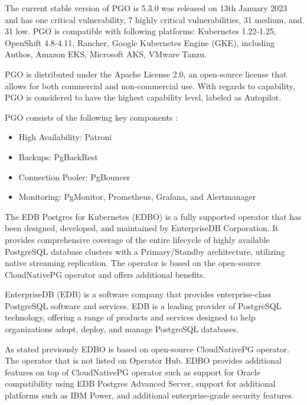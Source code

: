 The current stable version of PGO is 5.3.0 was released on 13th January 2023 and has one critical vulnerability, 7 highly critical vulnerabilities, 31 medium, and 31 low. \cite{ArtifactHubCrunchy}
PGO is compatible with following platforms: Kubernetes 1.22-1.25, OpenShift 4.8-4.11, Rancher, Google Kubernetes Engine (GKE), including Anthos, Amazon EKS, Microsoft AKS, VMware Tanzu. \cite{CrunchyDoc}

PGO is distributed under the Apache License 2.0, an open-source license that allows for both commercial and non-commercial use. With regards to capability, PGO is considered to have the highest capability level, labeled as Autopilot. \cite{OperatorHubCrunchy}

PGO consists of the following key components \cite{CrunchyPGOGit}:
\begin{itemize}
  \item High Availability: Patroni
  \item Backups: PgBackRest
  \item Connection Pooler: PgBouncer
  \item Monitoring: PgMonitor, Prometheus, Grafana, and Alertmanager
\end{itemize}


\pagebreak
{}
The EDB Postgres for Kubernetes (EDBO) is a fully supported operator that has been designed, developed, and maintained by EnterpriseDB Corporation. It provides comprehensive coverage of the entire lifecycle of highly available PostgreSQL database clusters with a Primary/Standby architecture, utilizing native streaming replication. The operator is based on the open-source CloudNativePG operator and offers additional benefits. \cite{OperatorHubEDB}

EnterpriseDB (EDB) is a software company that provides enterprise-class PostgreSQL software and services. EDB is a leading provider of PostgreSQL technology, offering a range of products and services designed to help organizations adopt, deploy, and manage PostgreSQL databases. \cite{EDB}

As stated previously EDBO is based on open-source CloudNativePG operator. The operator that is not listed on Operator Hub. EDBO provides additional features on top of CloudNativePG operator such as support for Oracle compatibility using EDB Postgres Advanced Server, support for additional platforms such as IBM Power, and additional enterprise-grade security features. \cite{EDBdocu}


